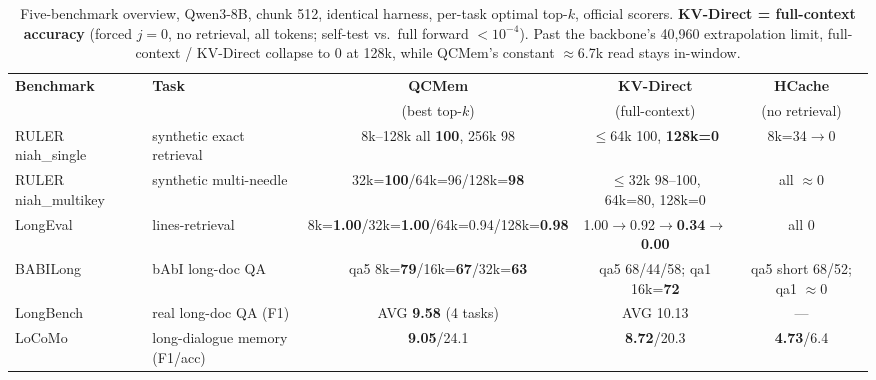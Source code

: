 \begin{table}[t]
\centering
\small
\begin{tabular}{@{}llccc@{}}
\toprule
\textbf{Benchmark} & \textbf{Task} & \textbf{QCMem} & \textbf{KV-Direct} & \textbf{HCache} \\
 & & (best top-$k$) & (full-context) & (no retrieval) \\
\midrule
RULER niah\_single & synthetic exact retrieval & 8k--128k all \textbf{100}, 256k 98 & $\le$64k 100, \textbf{128k=0} & 8k=34$\to$0 \\
RULER niah\_multikey & synthetic multi-needle & 32k=\textbf{100}/64k=96/128k=\textbf{98} & $\le$32k 98--100, 64k=80, 128k=0 & all $\approx$0 \\
LongEval & lines-retrieval & 8k=\textbf{1.00}/32k=\textbf{1.00}/64k=0.94/128k=\textbf{0.98} & 1.00$\to$0.92$\to$\textbf{0.34}$\to$\textbf{0.00} & all 0 \\
BABILong & bAbI long-doc QA & qa5 8k=\textbf{79}/16k=\textbf{67}/32k=\textbf{63} & qa5 68/44/58; qa1 16k=\textbf{72} & qa5 short 68/52; qa1 $\approx$0 \\
LongBench & real long-doc QA (F1) & AVG \textbf{9.58} (4 tasks) & AVG 10.13 & --- \\
LoCoMo & long-dialogue memory (F1/acc) & \textbf{9.05}/24.1 & \textbf{8.72}/20.3 & \textbf{4.73}/6.4 \\
\bottomrule
\end{tabular}
\caption{Five-benchmark overview, Qwen3-8B, chunk 512, identical harness, per-task optimal top-$k$, official scorers. \textbf{KV-Direct = full-context accuracy} (forced $j{=}0$, no retrieval, all tokens; self-test vs.\ full forward $<10^{-4}$). Past the backbone's 40{,}960 extrapolation limit, full-context / KV-Direct collapse to 0 at 128k, while QCMem's constant $\approx$6.7k read stays in-window.}
\label{tab:overview}
\end{table}
